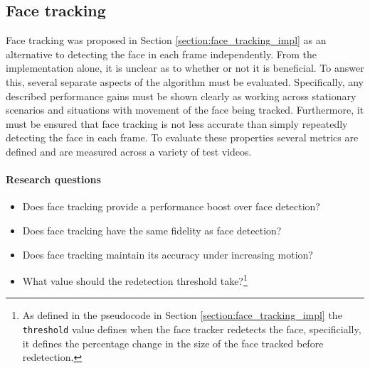 \subsection{Face tracking}
Face tracking was proposed in Section \ref{section:face_tracking_impl} as an alternative to detecting the face in each frame independently.
From the implementation alone, it is unclear as to whether or not it is beneficial. To answer this, several separate aspects of the algorithm must be evaluated. 
Specifically, any described performance gains must be shown clearly as working across stationary scenarios and situations with movement of the face being tracked. 
Furthermore, it must be ensured that face tracking is not less accurate than simply repeatedly detecting the face in each frame. 
To evaluate these properties several metrics are defined and are measured across a variety of test videos.
\paragraph{Research questions}
\begin{itemize}
    \item Does face tracking provide a performance boost over face detection?
    \item Does face tracking have the same fidelity as face detection?
    \item Does face tracking maintain its accuracy under increasing motion?
    \item What value should the redetection threshold take?\footnote{As defined in the pseudocode in Section \ref{section:face_tracking_impl} the \texttt{threshold} value defines when the face tracker redetects the face, specificially, it defines the percentage change in the size of the face tracked before redetection. }
\end{itemize}
